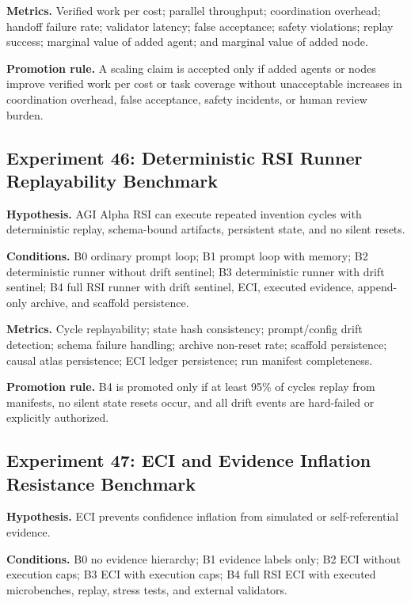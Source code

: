 \textbf{Metrics.} Verified work per cost; parallel throughput;
coordination overhead; handoff failure rate; validator latency; false
acceptance; safety violations; replay success; marginal value of added
agent; and marginal value of added node.

\textbf{Promotion rule.} A scaling claim is accepted only if added
agents or nodes improve verified work per cost or task coverage without
unacceptable increases in coordination overhead, false acceptance,
safety incidents, or human review burden.

\subsection{Experiment 46: Deterministic RSI Runner Replayability
Benchmark}\label{experiment-46-deterministic-rsi-runner-replayability-benchmark}

\textbf{Hypothesis.} AGI Alpha RSI can execute repeated invention cycles
with deterministic replay, schema-bound artifacts, persistent state, and
no silent resets.

\textbf{Conditions.} B0 ordinary prompt loop; B1 prompt loop with
memory; B2 deterministic runner without drift sentinel; B3 deterministic
runner with drift sentinel; B4 full RSI runner with drift sentinel, ECI,
executed evidence, append-only archive, and scaffold persistence.

\textbf{Metrics.} Cycle replayability; state hash consistency;
prompt/config drift detection; schema failure handling; archive
non-reset rate; scaffold persistence; causal atlas persistence; ECI
ledger persistence; run manifest completeness.

\textbf{Promotion rule.} B4 is promoted only if at least 95\% of cycles
replay from manifests, no silent state resets occur, and all drift
events are hard-failed or explicitly authorized.

\subsection{Experiment 47: ECI and Evidence Inflation Resistance
Benchmark}\label{experiment-47-eci-and-evidence-inflation-resistance-benchmark}

\textbf{Hypothesis.} ECI prevents confidence inflation from simulated or
self-referential evidence.

\textbf{Conditions.} B0 no evidence hierarchy; B1 evidence labels only;
B2 ECI without execution caps; B3 ECI with execution caps; B4 full RSI
ECI with executed microbenches, replay, stress tests, and external
validators.

